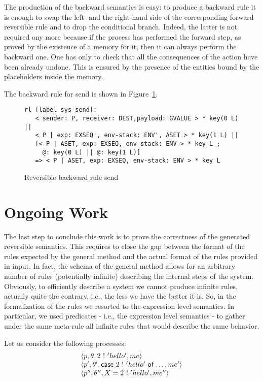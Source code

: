 \documentclass{article}[12pt,a4paper]
\theoremstyle{definition}
\begin{document}
The production of the backward semantics is easy: to produce a
backward rule it is enough to swap the left- and the right-hand side
of the corresponding forward reversible rule and to drop the
conditional branch.  Indeed, the latter is not required any more
because if the process has performed the forward step, as proved by
the existence of a memory for it, then it can always perform the
backward one. One has only to check that all the consequences of the
action have been already undone. This is ensured by the presence of
the entities bound by the placeholders inside the memory.

The backward rule for send is shown in Figure~\ref{fig:revsend}.

\begin{figure}[t]
  \centering
\begin{verbatim}
rl [label sys-send]:
   < sender: P, receiver: DEST,payload: GVALUE > * key(0 L) || 
   < P | exp: EXSEQ', env-stack: ENV', ASET > * key(1 L) || 
   [< P | ASET, exp: EXSEQ, env-stack: ENV > * key L ;
     @: key(0 L) || @: key(1 L)]
   => < P | ASET, exp: EXSEQ, env-stack: ENV > * key L 
\end{verbatim}
  
  \caption{Reversible backward rule send}
  \label{fig:revsend}
\end{figure}

\section{Ongoing Work}\label{sec:ongoing-work}

The last step to conclude this work is to prove the correctness of the
generated reversible semantics. This requires to close the gap between
the format of the rules expected by the general method and the actual
format of the rules provided in input. In fact, the schema of the
general method allows for an arbitrary number of rules (potentially
infinite) describing the internal steps of the system. Obviously, to
efficiently describe a system we cannot produce infinite rules,
actually quite the contrary, i.e., the less we have the better it
is. So, in the formalization of the rules we resorted to the
expression level semantics. In particular, we used predicates - i.e.,
the expression level semantics - to gather under the same meta-rule
all infinite rules that would describe the same behavior.

Let us consider the following processes:
\[
  \begin{array}{l}
    \langle p, \theta, 2~\mathsf{!}~'hello', me\rangle\\
    \langle p', \theta', \mathsf{case}~2~\mathsf{!}~'hello'~\mathsf{of} \ldots, me'\rangle\\
    \langle p'', \theta'', X = 2~\mathsf{!}~'hello', me''\rangle 
  \end{array}
\]
\end{document}
